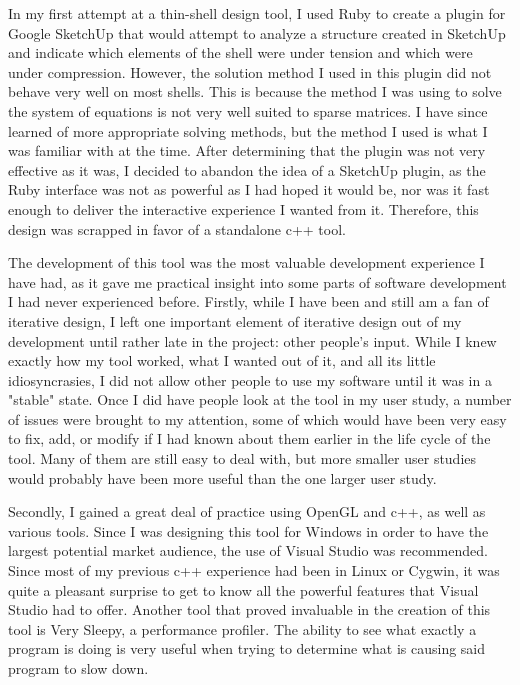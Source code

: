 \documentclass{thesis}
\begin{document}
In my first attempt at a thin-shell design tool, I used Ruby to create a plugin for Google SketchUp that would attempt to analyze
a structure created in SketchUp and indicate which elements of the shell were under tension and which were under compression.
However, the solution method I used in this plugin did not behave very well on most shells.  This is because the method I was
using to solve the system of equations is not very well suited to sparse matrices.  I have since learned of more appropriate
solving methods, but the method I used is what I was familiar with at the time.  After determining that the plugin was not
very effective as it was, I decided to abandon the idea of a SketchUp plugin, as the Ruby interface was not as powerful as I had
hoped it would be, nor was it fast enough to deliver the interactive experience I wanted from it.  Therefore, this design was
scrapped in favor of a standalone c++ tool.

The development of this tool was the most valuable development experience I have had, as it gave me practical insight into some
parts of software development I had never experienced before.  Firstly, while I have been and still am a fan of iterative
design, I left one important element of iterative design out of my development until rather late in the project: other people's
input.  While I knew exactly how my tool worked, what I wanted out of it, and all its little idiosyncrasies, I did not allow
other people to use my software until it was in a "stable" state.  Once I did have people look at the tool in my user study,
a number of issues were brought to my attention, some of which would have been very easy to fix, add, or modify if I had known
about them earlier in the life cycle of the tool.  Many of them are still easy to deal with, but more smaller user studies
would probably have been more useful than the one larger user study.

Secondly, I gained a great deal of practice using OpenGL and c++, as well as various tools.  Since I was designing this tool for
Windows in order to have the largest potential market audience, the use of Visual Studio was recommended.  Since most of my
previous c++ experience had been in Linux or Cygwin, it was quite a pleasant surprise to get to know all the powerful features
that Visual Studio had to offer.  Another tool that proved invaluable in the creation of this tool is Very Sleepy, a performance
profiler.  The ability to see what exactly a program is doing is very useful when trying to determine what is causing said
program to slow down.
\end{document}
